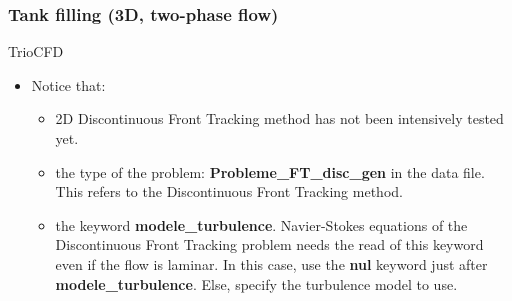 \documentclass[10pt, hyperref={unicode=true,pdfusetitle, bookmarks=true,bookmarksnumbered=false,bookmarksopen=false, breaklinks=false,pdfborder={0 0l 1},backref=true,colorlinks=true,linkcolor=darkblue,pageanchor}]{beamer}
\begin{document}
\begin{frame}
\frametitle{Tank filling (3D, two-phase flow)}
\begin{block}{TrioCFD}

\begin{itemize}


\item Notice that:
    \begin{itemize}
    \item [$\circ$] 2D Discontinuous Front Tracking method has not been intensively tested yet.
    \item [$\circ$] the type of the problem: \textbf{Probleme\_FT\_disc\_gen} in the data file. This refers to the Discontinuous Front Tracking method.
    \item [$\circ$] the keyword \textbf{modele\_turbulence}. Navier-Stokes equations of the Discontinuous Front Tracking problem needs the read of this keyword even if the flow is laminar. In this case, use the \textbf{nul} keyword just after \textbf{modele\_turbulence}. Else, specify the turbulence model to use.
    \end{itemize}
\end{itemize}

\end{block}
\end{frame}
\end{document}
